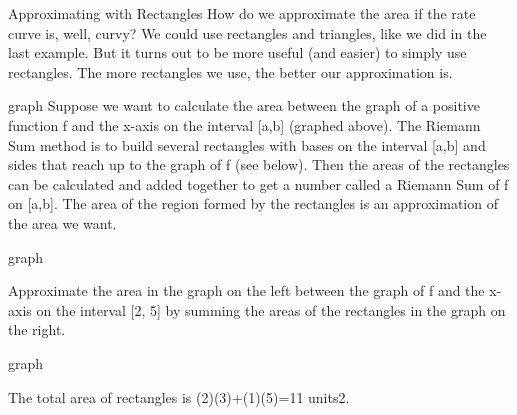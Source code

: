 Approximating with Rectangles
How do we approximate the area if the rate curve is, well, curvy? We could use rectangles and triangles, like we did in the last example. But it turns out to be more useful (and easier) to simply use rectangles. The more rectangles we use, the better our approximation is.

graph
Suppose we want to calculate the area between the graph of a positive function f and the x-axis on the interval [a,b] (graphed above). The Riemann Sum method is to build several rectangles with bases on the interval [a,b] and sides that reach up to the graph of f (see below). Then the areas of the rectangles can be calculated and added together to get a number called a Riemann Sum of f on [a,b]. The area of the region formed by the rectangles is an approximation of the area we want.

graph
\begin{example}
Approximate the area in the graph on the left between the graph of f and the x-axis on the interval [2, 5] by summing the areas of the rectangles in the graph on the right.

graph
\begin{solution}
The total area of rectangles is
(2)(3)+(1)(5)=11 units2.
\end{solution}\end{example}

